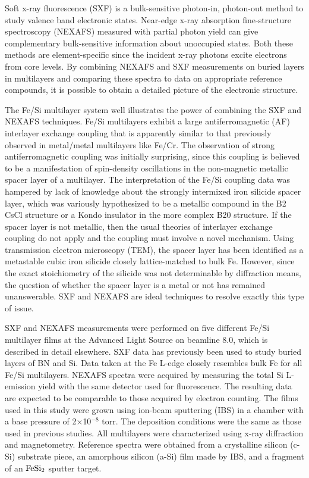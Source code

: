 Soft x-ray fluorescence (SXF) is a bulk-sensitive photon-in,
photon-out method to study valence band electronic
states.\cite{ederer} Near-edge x-ray absorption fine-structure
spectroscopy (NEXAFS) measured with partial photon yield can give
complementary bulk-sensitive information about unoccupied
states.\cite{stohrbook} Both these methods are element-specific since
the incident x-ray photons excite electrons from core levels.  By
combining NEXAFS and SXF measurements on buried layers in multilayers
and comparing these spectra to data on appropriate reference
compounds, it is possible to obtain a detailed picture of the
electronic structure.

The Fe/Si multilayer system well illustrates the power of combining
the SXF and NEXAFS techniques.  Fe/Si multilayers exhibit a large
antiferromagnetic (AF) interlayer exchange coupling that is apparently
similar to that previously observed in metal/metal multilayers like
Fe/Cr.\cite{fullerton} The observation of strong antiferromagnetic
coupling was initially surprising, since this coupling is believed to
be a manifestation of spin-density oscillations in the non-magnetic
metallic spacer layer of a multilayer.\cite{hathaway} The
interpretation of the Fe/Si coupling data was hampered by lack of
knowledge about the strongly intermixed iron silicide spacer layer,
which was variously hypothesized to be a metallic compound in the B2
CsCl structure\cite{fullerton} or a Kondo insulator in the more
complex B20 structure.\cite{mattson} If the spacer layer is not
metallic, then the usual theories of interlayer exchange coupling do
not apply\cite{hathaway} and the coupling must involve a novel
mechanism.  Using transmission electron microscopy (TEM), the spacer
layer has been identified as a metastable cubic iron silicide closely
lattice-matched to bulk Fe.\cite{fesiprb} However, since the exact
stoichiometry of the silicide was not determinable by diffraction
means, the question of whether the spacer layer is a metal or not has
remained unanswerable.  SXF and NEXAFS are ideal techniques to resolve
exactly this type of issue.

SXF and NEXAFS measurements were performed on five different Fe/Si
multilayer films at the Advanced Light Source on beamline 8.0, which
is described in detail elsewhere.\cite{beamline} SXF data has
previously been used to study buried layers of BN\cite{carlisle} and
Si.\cite{nilsson} Data taken at the Fe L-edge closely resembles bulk
Fe for all Fe/Si multilayers.  NEXAFS spectra were acquired by
measuring the total Si L-emission yield with the same detector used
for fluorescence.  The resulting data are expected to be comparable to
those acquired by electron counting.\cite{stohrbook} The films used in
this study were grown using ion-beam sputtering (IBS) in a chamber
with a base pressure of 2$\times$10$^{-8}$ torr.  The deposition
conditions were the same as those used in previous
studies.\cite{fesiprb} All multilayers were characterized using x-ray
diffraction and magnetometry.  Reference spectra were obtained from a
crystalline silicon (c-Si) substrate piece, an amorphous silicon
(a-Si) film made by IBS, and a fragment of an $\rm FeSi_2$ sputter
target.

